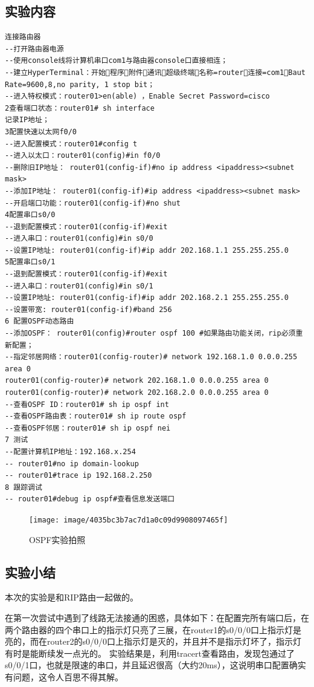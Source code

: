\documentclass[lang=cn,11pt,a4paper,cite=authoryear]{elegantpaper}
\begin{document}
\subsection{实验内容}

\begin{lstlisting}
连接路由器
--打开路由器电源
--使用console线将计算机串口com1与路由器console口直接相连；
--建立HyperTerminal：开始程序附件通讯超级终端名称=router连接=com1Baut Rate=9600,8,no parity, 1 stop bit；
--进入特权模式：router01>en(able) ，Enable Secret Password=cisco
2查看端口状态：router01# sh interface
记录IP地址；
3配置快速以太网f0/0
--进入配置模式：router01#config t
--进入以太口：router01(config)#in f0/0
--删除旧IP地址： router01(config-if)#no ip address <ipaddress><subnet mask>
--添加IP地址： router01(config-if)#ip address <ipaddress><subnet mask>
--开启端口功能：router01(config-if)#no shut
4配置串口s0/0
--退到配置模式：router01(config-if)#exit
--进入串口：router01(config)#in s0/0
--设置IP地址: router01(config-if)#ip addr 202.168.1.1 255.255.255.0
5配置串口s0/1
--退到配置模式：router01(config-if)#exit
--进入串口：router01(config)#in s0/1
--设置IP地址: router01(config-if)#ip addr 202.168.2.1 255.255.255.0
--设置带宽: router01(config-if)#band 256
6 配置OSPF动态路由
--添加OSPF： router01(config)#router ospf 100 #如果路由功能关闭，rip必须重新配置；
--指定邻居网络：router01(config-router)# network 192.168.1.0 0.0.0.255 area 0
router01(config-router)# network 202.168.1.0 0.0.0.255 area 0
router01(config-router)# network 202.168.2.0 0.0.0.255 area 0
--查看OSPF ID：router01# sh ip ospf int 
--查看OSPF路由表：router01# sh ip route ospf 
--查看OSPF邻居：router01# sh ip ospf nei
7 测试
--配置计算机IP地址：192.168.x.254
-- router01#no ip domain-lookup
-- router01#trace ip 192.168.2.250
8 跟踪调试
-- router01#debug ip ospf#查看信息发送端口

\end{lstlisting}

\begin{figure}[htbp]
	\centering
	\texttt{[image: image/4035bc3b7ac7d1a0c09d9908097465f]}
	\caption{OSPF实验拍照}
	\label{fig:4035bc3b7ac7d1a0c09d9908097465f}
\end{figure}


\subsection{实验小结}

本次的实验是和RIP路由一起做的。

在第一次尝试中遇到了线路无法接通的困惑，具体如下：在配置完所有端口后，在两个路由器的四个串口上的指示灯只亮了三展，在router1的s0/0/0口上指示灯是亮的，而在router2的s0/0/0口上指示灯是灭的，并且并不是指示灯坏了，指示灯有时是能断续发一点光的。
实验结果是，利用tracert查看路由，发现包通过了s0/0/1口，也就是限速的串口，并且延迟很高（大约20ms），这说明串口配置确实有问题，这令人百思不得其解。
\end{document}
